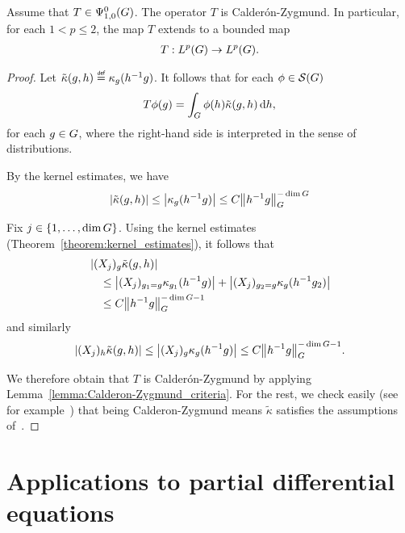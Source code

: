\begin{proposition}
    Assume that $T \in \OperatorClass 0 {1, 0}$.
    The operator $T$ is Calder\'on-Zygmund.
    In particular, for each $1 < p \leq 2$,
    the map $T$ extends to a bounded map
    \begin{align*}
        T : \Lebesgue p \Group \to \Lebesgue p \Group.
    \end{align*}
\end{proposition}
\begin{proof}
    Let $\tilde \kappa(g, h) \defeq \kappa_g(h^{-1} g)$.
    It follows that for each $\phi \in \Schwartz \Group$
    \begin{align*}
        T \phi(g) = \int_{\Group} \phi(h) \tilde \kappa(g, h) \dd h,
    \end{align*}
    for each $g \in \Group$,
    where the right-hand side is interpreted in the sense of distributions.

    By the kernel estimates,
    we have
    \begin{align*}
        \abs {\tilde \kappa(g, h)} \leq \abs {\kappa_g(h^{-1} g)} \leq C \norm [\Group] {h^{-1} g}^{-\dim \Group}
    \end{align*}

    Fix $j \in \{1, \dots, \dim \Group\}$.
    Using the kernel estimates (Theorem~\ref{theorem:kernel_estimates}),
    it follows that
    \begin{align*}
        &\abs {(\LeftDifferentialOperatorFirstOrder {X_j})_{g} \tilde \kappa(g, h)}\\
        &\quad \leq
        \abs {(X_j)_{g_1 = g} \kappa_{g_1}(h^{-1} g)}
        + \abs {(X_j)_{g_2 = g} \kappa_{g}(h^{-1} g_2)}\\
        &\quad \leq
        C \norm [\Group] {h^{-1} g}^{-\dim \Group - 1}
    \end{align*}
    and similarly
    \begin{align*}
        \abs {(\LeftDifferentialOperatorFirstOrder {X_j})_{h} \tilde \kappa(g, h)}
        \leq \abs {(X_j)_{g} \kappa_{g}(h^{-1} g)}
        \leq C \norm [\Group] {h^{-1} g}^{-\dim \Group - 1}.
    \end{align*}

    We therefore obtain that $T$ is Calder\'on-Zygmund by applying Lemma~\ref{lemma:Calderon-Zygmund_criteria}.
    For the rest,
    we check easily (see for example~\cite[Proposition 3.2.17]{FischerRuzhansky16})
    that being Calderon-Zygmund means $\tilde \kappa$ satisfies the assumptions of~\cite[Theorem A.4.4]{FischerRuzhansky16}.
\end{proof}

\section{Applications to partial differential equations}
